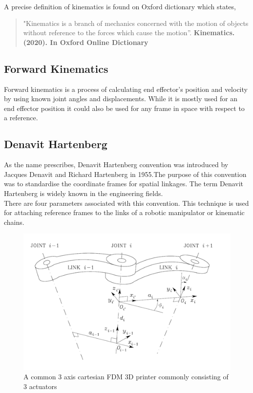 \documentclass{UoNMCHA}
\numberwithin{equation}{section}
\begin{document}
	A precise definition of kinematics is found on Oxford dictionary which states, \begin{quote}
		"Kinematics is a branch of mechanics concerned with the motion of objects without reference to the forces which cause the motion”.\textbf{ Kinematics. (2020). In Oxford Online Dictionary }
	\end{quote} 
	
	\subsection{Forward Kinematics}
	
	Forward kinematics is a process of calculating end effector’s position and velocity by using known joint angles and displacements. While it is mostly used for an end effector position it could also be used for any frame in space with respect to a reference.
	
	\subsection*{Denavit Hartenberg}
	As the name prescribes, Denavit Hartenberg convention was introduced by Jacques Denavit and Richard Hartenberg in 1955.The purpose of this convention was to standardise the coordinate frames for spatial linkages. The term Denavit Hartenberg is widely known in the engineering fields. \\
	
	There are four parameters associated with this convention. This technique is used for attaching reference frames to the links of a robotic manipulator or kinematic chains.
	
	\begin{figure}[H]
		\begin{center}
			\includegraphics[width=.8\linewidth]{figs/Picture2}
			\caption{A  common 3 axis cartesian FDM 3D printer commonly consisting of 3 actuators}
			\label{figs/Picture2}
		\end{center}
	\end{figure}
	
\end{document}
